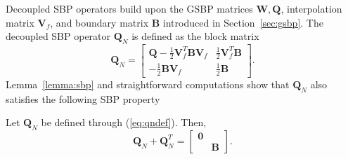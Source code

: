 \documentclass[review,onefignum,onetabnum,final]{siamart171218}
\begin{document}
Decoupled SBP operators build upon the GSBP matrices $\bm{W}, \bm{Q}$, interpolation matrix $\bm{V}_f$, and boundary matrix $\bm{B}$ introduced in Section~\ref{sec:gsbp}.  The decoupled SBP operator $\bm{Q}_N$ is defined as the block matrix 
\begin{equation}
\bm{Q}_N  = \begin{bmatrix}
\bm{Q} - \frac{1}{2}\bm{V}_f^T\bm{B}\bm{V}_f & \frac{1}{2}\bm{V}_f^T\bm{B}\\
-\frac{1}{2}\bm{B}\bm{V}_f & \frac{1}{2}\bm{B}
\end{bmatrix}.
\label{eq:qndef}
\end{equation}
Lemma~\ref{lemma:sbp} and straightforward computations show that $\bm{Q}_N$ also satisfies the following SBP property
\begin{lemma}
\label{lemma:dsbp}
Let $\bm{Q}_N$ be defined through (\ref{eq:qndef}).  Then,
\[
\bm{Q}_N + \bm{Q}_N^T = \begin{bmatrix}
\bm{0} &\\
& \bm{B}
\end{bmatrix}.
\]
\end{lemma}
\end{document}
